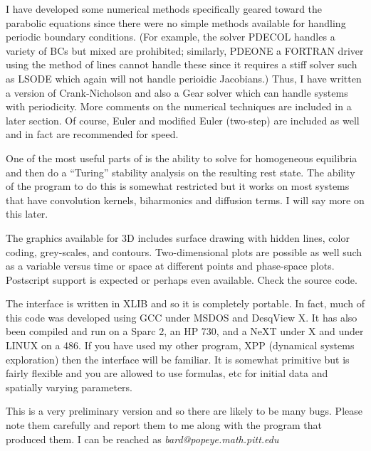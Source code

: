 I have developed some numerical methods
specifically geared toward the parabolic equations since there were no
simple methods available for handling periodic boundary conditions.
(For example, the solver PDECOL handles a variety of BCs but mixed are
prohibited; similarly, PDEONE a FORTRAN driver using the method of
lines cannot handle these since it requires a stiff solver such as
LSODE which again will not handle perioidic Jacobians.)  Thus, I have
written a version of Crank-Nicholson and also a Gear solver which can
handle systems with periodicity.  More comments on the numerical
techniques are included in a later section.  Of course, Euler and
modified Euler (two-step) are included as well and in fact are
recommended for speed.

One of the most useful parts of \xtc is the ability to solve for
homogeneous equilibria and then do a ``Turing'' stability analysis on
the resulting rest state.  The ability of the program to do this is
somewhat restricted but it works on most systems that have convolution
kernels, biharmonics and diffusion terms.  I will say more on this later.

The graphics available for 3D includes surface drawing with hidden
lines, color coding, grey-scales, and contours.  Two-dimensional plots
are possible as well such as a variable versus time or space at
different points and phase-space plots. Postscript support is expected
or perhaps even available.  Check the source code.  

The interface is written in XLIB and so it is completely portable.  In
fact, much of this code was developed using GCC under MSDOS and
DesqView X.  It has also been compiled and run on a Sparc 2, an HP
730, and a NeXT under X and under LINUX on a 486.  
If you have used my other program, XPP
(dynamical systems exploration) then the interface will be familiar.
It is somewhat primitive but is fairly flexible and you are allowed to
use formulas, etc for initial data and spatially varying parameters.

This is a very preliminary version and so there are likely to be many
bugs. Please note them carefully and report them to me along with the
program that produced them.  I can be reached as {\it
bard@popeye.math.pitt.edu}
  
